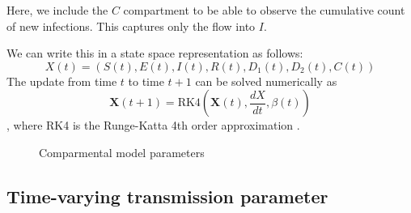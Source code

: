 \documentclass{umassthesis}          %
\begin{document}
Here, we include the $C$ compartment to be able to observe the cumulative count of new infections. This captures only the flow into $I$.

We can write this in a state space representation as follows: \[
X(t) = (S(t), E(t), I(t), R(t), D_1(t), D_2(t), C(t))
\]
The update from time $t$ to time $t+1$ can be solved numerically as
\begin{equation}
\bm{X}(t+1)= \text{RK4}\left(\bm{X}(t),\frac{dX}{dt},\beta(t)\right)
\end{equation},
where RK4 is the Runge-Katta 4th order approximation \cite{phan2019composable}.


\begin{figure}
 \begin{center}
\end{center}
      \caption{Comparmental model parameters }
     \label{fig:seird}
 \end{figure}
 
 
 
 

 
 \subsection{Time-varying transmission parameter}
 
\end{document}
